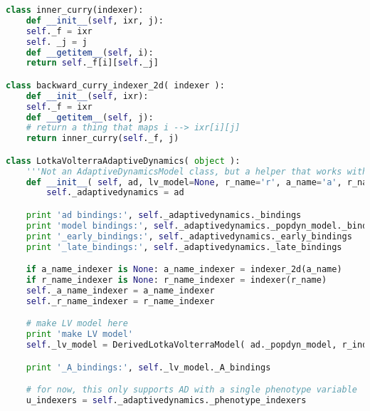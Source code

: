 \begin{lstlisting}[language=Python]
class inner_curry(indexer):
    def __init__(self, ixr, j):
	self._f = ixr
	self. _j = j
    def __getitem__(self, i):
	return self._f[i][self._j]

class backward_curry_indexer_2d( indexer ):
    def __init__(self, ixr):
	self._f = ixr
    def __getitem__(self, j):
	# return a thing that maps i --> ixr[i][j]
	return inner_curry(self._f, j)

class LotkaVolterraAdaptiveDynamics( object ):
    '''Not an AdaptiveDynamicsModel class, but a helper that works with one.'''
    def __init__( self, ad, lv_model=None, r_name='r', a_name='a', r_name_indexer=None, a_name_indexer=None ):
        self._adaptivedynamics = ad

	print 'ad bindings:', self._adaptivedynamics._bindings
	print 'model bindings:', self._adaptivedynamics._popdyn_model._bindings
	print '_early_bindings:', self._adaptivedynamics._early_bindings
	print '_late_bindings:', self._adaptivedynamics._late_bindings

	if a_name_indexer is None: a_name_indexer = indexer_2d(a_name)
	if r_name_indexer is None: r_name_indexer = indexer(r_name)
	self._a_name_indexer = a_name_indexer
	self._r_name_indexer = r_name_indexer

	# make LV model here
	print 'make LV model'
	self._lv_model = DerivedLotkaVolterraModel( ad._popdyn_model, r_indexer=r_name_indexer, a_indexer=a_name_indexer )

	print '_A_bindings:', self._lv_model._A_bindings

	# for now, this only supports AD with a single phenotype variable
	u_indexers = self._adaptivedynamics._phenotype_indexers


\end{lstlisting}
